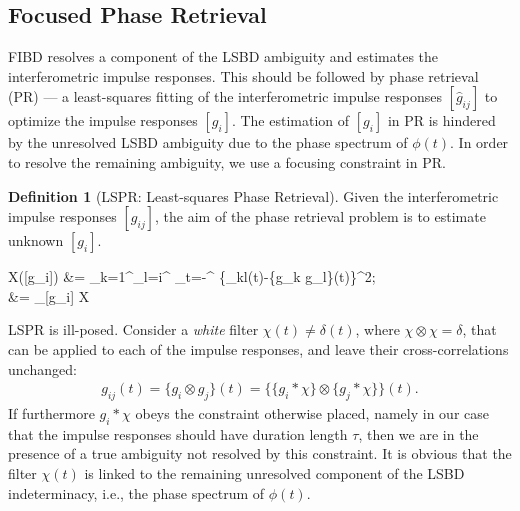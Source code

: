 \documentclass{article}
\theoremstyle{definition}
\newtheorem{defn}{Definition}
\def\vecc#1{[#1]}
\newcommand\sa[1][]{{#1{s}}_{\rm a}}
\begin{document}
{\subsection{Focused Phase Retrieval}

FIBD resolves  
a component of 
the LSBD ambiguity and estimates the 
interferometric impulse responses.
%
This should be followed by
phase retrieval (PR) --- a least-squares fitting of the
interferometric impulse responses $\vecc{\hat{g}_{ij}}$ to optimize the impulse responses
$\vecc{g_i}$.
%
The estimation of $\vecc{g_i}$ in PR is hindered by the
unresolved LSBD ambiguity due to 
the phase spectrum of $\phi(t)$.
%
In order to
resolve the remaining ambiguity, 
we use a focusing constraint in PR.
%
%

\begin{defn}[LSPR: Least-squares Phase Retrieval]\label{def:lspr} 
	Given the interferometric impulse responses 
	$\vecc{g_{ij}}$, the aim of the 
	phase retrieval problem is to estimate unknown $\vecc{g_i}$.
	\begin{flalign}
	\label{eqn:lspr}
		X(\vecc{g_{i}}) &=
		\sum_{k=1}^{\Nr}\sum_{l=i}^{\Nr} \sum_{t=-\tau}^{\tau} \{_{kl}(t)-\{g_k \otimes g_l\}(t)\}^2{;} \\
		\vecc{\hat{g}_{i}}&=  _{\vecc{g_{i}}} \qquad X  
	\end{flalign}
%
LSPR 
	is ill-posed. Consider a \emph{white} filter $\chi(t)\ne\delta(t)$, where
$\chi \otimes \chi=\delta$, that can be
applied to each of the impulse responses, and leave their cross-correlations unchanged:
\begin{eqnarray}
	\label{eqn:lspr_unknown}
	g_{ij}(t) = \{g_i \otimes g_j\}(t) = \{\{g_i\ast\chi\}\otimes\{g_j\ast\chi\}\}(t).
\end{eqnarray}
%
If furthermore $g_i\ast\chi$ obeys the constraint otherwise placed, 
namely in our case that the impulse responses should have duration length 
$\tau$, then we are in the presence of a true ambiguity not resolved by this constraint.
%
It is obvious that 
the filter $\chi(t)$ is linked to the remaining unresolved component
of the LSBD indeterminacy, i.e., 
	the phase spectrum of $\phi(t)$. 
%
\end{defn}

}
\end{document}

